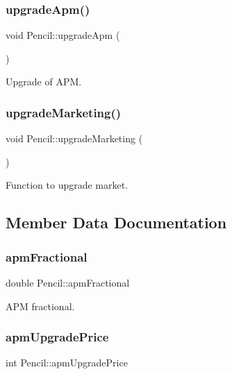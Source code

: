 \subsubsection{\texorpdfstring{upgrade\+Apm()}{upgradeApm()}}
{\footnotesize\ttfamily void Pencil\+::upgrade\+Apm (\begin{DoxyParamCaption}{ }\end{DoxyParamCaption})}

Upgrade of A\+PM. \mbox{\label{classPencil_a4d1fff5599020013b3b52cf84d714847}} 
\subsubsection{\texorpdfstring{upgrade\+Marketing()}{upgradeMarketing()}}
{\footnotesize\ttfamily void Pencil\+::upgrade\+Marketing (\begin{DoxyParamCaption}{ }\end{DoxyParamCaption})}

Function to upgrade market. 

\subsection{Member Data Documentation}
\mbox{\label{classPencil_a71b50db432298677e50884b34002bbcf}} 
\subsubsection{\texorpdfstring{apm\+Fractional}{apmFractional}}
{\footnotesize\ttfamily double Pencil\+::apm\+Fractional}

A\+PM fractional. \mbox{\label{classPencil_a1f05477be34cb47d39c3888fb1c4092c}} 
\subsubsection{\texorpdfstring{apm\+Upgrade\+Price}{apmUpgradePrice}}
{\footnotesize\ttfamily int Pencil\+::apm\+Upgrade\+Price}

